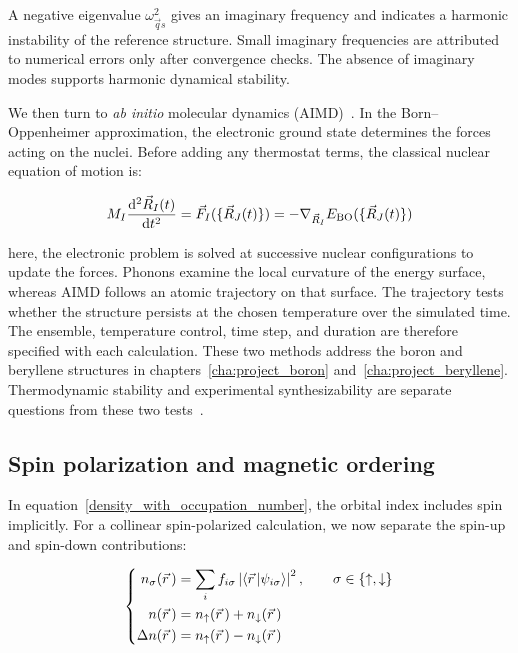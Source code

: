 A negative eigenvalue $\omega_{\vec{q}s}^{2}$ gives an imaginary frequency and indicates a harmonic instability of the reference structure.
Small imaginary frequencies are attributed to numerical errors only after convergence checks.
The absence of imaginary modes supports harmonic dynamical stability.

We then turn to \textit{ab initio} molecular dynamics (AIMD)~\cite{marx2009ab}.
In the Born--Oppenheimer approximation,
the electronic ground state determines the forces acting on the nuclei.
Before adding any thermostat terms, the classical nuclear equation of motion is:

\begin{equation}
    M_I\frac{\mathrm{d}^2\vec{R}_I(t)}{\mathrm{d} t^2}
    =
    \vec{F}_I(\{\vec{R}_J(t)\})
    =
    -\nabla_{\vec{R}_I}E_\mathrm{BO}(\{\vec{R}_J(t)\})
\label{born_oppenheimer_nuclear_motion}
\end{equation}

here, the electronic problem is solved at successive nuclear configurations to update the forces.
Phonons examine the local curvature of the energy surface,
whereas AIMD follows an atomic trajectory on that surface.
The trajectory tests whether the structure persists at the chosen temperature over the simulated time.
The ensemble, temperature control, time step, and duration are therefore specified with each calculation.
These two methods address the boron and beryllene structures in chapters~\ref{cha:project_boron} and~\ref{cha:project_beryllene}.
Thermodynamic stability and experimental synthesizability are separate questions from these two tests~\cite{stampfl2005surface}.

\FloatBarrier
\subsection{Spin polarization and magnetic ordering}
\label{subsec:method_magnetism}

In equation~\eqref{density_with_occupation_number}, the orbital index includes spin implicitly.
For a collinear spin-polarized calculation,
we now separate the spin-up and spin-down contributions:

\begin{equation}
\left\{\begin{aligned}
    n_\sigma(\vec{r}\,)
    &=\sum_i f_{i\sigma}\left|\braket{\vec{r}\,|\psi_{i\sigma}}\right|^2,
    \qquad \sigma\in\{\uparrow,\downarrow\} \\
    n(\vec{r}\,)&=n_\uparrow(\vec{r}\,)+n_\downarrow(\vec{r}\,) \\
    \Delta n(\vec{r}\,)&=n_\uparrow(\vec{r}\,)-n_\downarrow(\vec{r}\,)
\end{aligned}\right.
\label{spin_resolved_density_method}
\end{equation}

